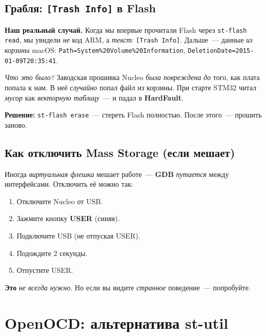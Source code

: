 \subsection{Грабля: \texttt{[Trash Info]} в Flash}

\begin{warnbox}
\textbf{Наш реальный случай.} Когда мы впервые
прочитали Flash через \texttt{st-flash read}, мы
увидели \emph{не} код ARM, а \emph{текст}:
\texttt{[Trash Info]}. Дальше~--- данные \emph{из} \emph{корзины}
macOS: \texttt{Path=System\%20Volume\%20Information},
\texttt{DeletionDate=2015-01-09T20:35:41}.

\emph{Что это было?} Заводская прошивка Nucleo
\emph{была повреждена} \emph{до} того, как плата
попала к нам. В неё \emph{случайно} попал файл из
корзины. При старте STM32 читал \emph{мусор} как
\emph{векторную таблицу}~--- и падал в \textbf{HardFault}.

\textbf{Решение:} \texttt{st-flash erase}~--- стереть
Flash полностью. После этого~--- прошить заново.
\end{warnbox}

\subsection{Как отключить Mass Storage (если мешает)}

Иногда \emph{виртуальная флешка} мешает работе~---
\textbf{GDB} \emph{путается} между интерфейсами.
Отключить её можно так:

\begin{enumerate}
    \item Отключите Nucleo от USB.
    \item Зажмите кнопку \textbf{USER} (синяя).
    \item Подключите USB (не отпуская USER).
    \item Подождите 2 секунды.
    \item Отпустите USER.
\end{enumerate}

\begin{notebox}
\textbf{Это} \emph{не всегда нужно}. Но если вы
видите \emph{странное} поведение~--- попробуйте.
\end{notebox}

\section{OpenOCD: альтернатива st-util}
\label{sec:flashing-openocd}

